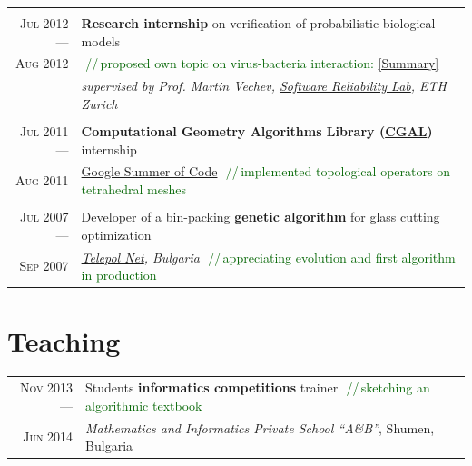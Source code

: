 \documentclass[a4paper,10pt]{article}
\def\myline{\color{linegray}\vline}
\newcommand{\minorcolor}[1]{\textcolor{mygray}{#1}}
\newcommand{\comment}[1]{\small\textcolor{darkgreen}{\,\,//\,#1}}
\newcommand{\mydate}[1]{\minorcolor{\textsc{#1}}}
\begin{document}
{\begin{tabular}{r!{\myline}p{14cm}}
        \\
        \mydate{Jul 2012 ---}       &   \textbf{Research internship} on verification of probabilistic biological models\\
        \mydate{Aug 2012}           &   \comment{proposed own topic on virus-bacteria interaction: \href{https://docs.google.com/document/d/1tNkXLaWY3ooA4MEnrbrL2_DOpOaiTlLoFblwzKFZdy0/edit?usp=sharing}{[Summary]}}\\
                                    &   \textit{supervised by Prof. Martin Vechev, \href{http://www.srl.inf.ethz.ch/}{Software Reliability Lab}, ETH Zurich}\\
	
        \\
        \mydate{Jul 2011 ---}       &   \textbf{Computational Geometry Algorithms Library (\href{http://www.cgal.org/}{CGAL})} internship\\
        \mydate{Aug 2011}           &   \href{http://code.google.com/soc/}{Google Summer of Code}
                                        \comment{implemented topological operators on tetrahedral meshes}\\

	\\
        \mydate{Jul 2007 ---}       &   Developer of a bin-packing \textbf{genetic algorithm} for glass cutting optimization\\
        \mydate{Sep 2007}           &   \textit{\href{http://telepol.net/telepol.net/}{Telepol Net}, Bulgaria}
                                        \comment{appreciating evolution and first algorithm in production}\\
\end{tabular}


\section{Teaching}
\hspace{0mm}\begin{tabular}{r!{\myline}p{14cm}}
        \mydate{Nov 2013 ---}       &   Students \textbf{informatics competitions} trainer
                                        \comment{sketching an algorithmic textbook}\\
        \mydate{Jun 2014}           &   \textit{Mathematics and Informatics Private School ``A\&B''}, Shumen, Bulgaria\\ %


\end{tabular}}
\end{document}
